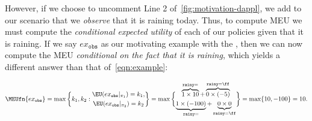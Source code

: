 However, if we choose to uncomment Line 2 of~\cref{fig:motivation-dappl},
we add to our scenario that we \textit{observe} that it is raining today.
Thus, to compute MEU we must compute the \textit{conditional expected utility}
of each of our policies given that it is raining.
If we say $ex_{\texttt{obs}}$ as our motivating example with the ,
then we can now compute the MEU \textit{conditional on the fact that it is raining},
which yields a different answer than that of~\cref{eqn:example}:

{\footnotesize
\begin{equation}\label{eqn:example-with-observe}
  \MEUfn {ex_{\texttt{obs}}} =
    \max \bigg\{k_1, k_2 :\begin{gathered}
      \EU(ex_{\texttt{obs}}|_{\pi_1})= k_1, \\
      \EU(ex_{\texttt{obs}}|_{\pi_2})= k_2
  \end{gathered}\bigg\} =
    \max\bigg\{\begin{gathered}
    \overbrace{1 \times 10}^{\texttt{rainy}=\tt}  + \overbrace{0 \times (-5)}^{\texttt{rainy}=\ff} \\
    \underbrace{1 \times (-100)}_{\texttt{rainy}=\tt} + \underbrace{0 \times 0}_{\texttt{rainy}=\ff}
    \end{gathered}\bigg\} =
  \max \{10,-100\} =10.
\end{equation}
}


